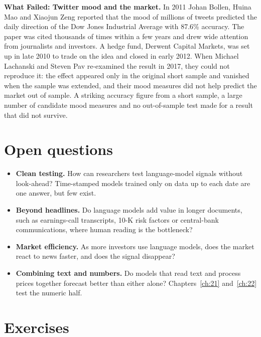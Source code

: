 \begin{callout}
\textbf{What Failed: Twitter mood and the market.} In 2011 Johan Bollen, Huina Mao and Xiaojun Zeng reported that the mood of millions of tweets predicted the daily direction of the Dow Jones Industrial Average with 87.6\% accuracy. The paper was cited thousands of times within a few years and drew wide attention from journalists and investors. A hedge fund, Derwent Capital Markets, was set up in late 2010 to trade on the idea and closed in early 2012. When Michael Lachanski and Steven Pav re-examined the result in 2017, they could not reproduce it: the effect appeared only in the original short sample and vanished when the sample was extended, and their mood measures did not help predict the market out of sample. A striking accuracy figure from a short sample, a large number of candidate mood measures and no out-of-sample test made for a result that did not survive.
\end{callout}

\section{Open questions}
\label{sec:23-open}

\begin{itemize}
  \item \textbf{Clean testing.} How can researchers test language-model signals without look-ahead? Time-stamped models trained only on data up to each date are one answer, but few exist.
  \item \textbf{Beyond headlines.} Do language models add value in longer documents, such as earnings-call transcripts, 10-K risk factors or central-bank communications, where human reading is the bottleneck?
  \item \textbf{Market efficiency.} As more investors use language models, does the market react to news faster, and does the signal disappear?
  \item \textbf{Combining text and numbers.} Do models that read text and process prices together forecast better than either alone? Chapters~\ref{ch:21} and~\ref{ch:22} test the numeric half.
\end{itemize}

\section*{Exercises}

